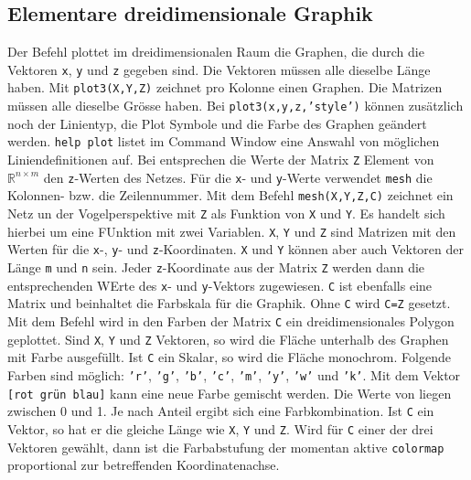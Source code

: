 \subsection{Elementare dreidimensionale Graphik}
Der Befehl  plottet im dreidimensionalen Raum die Graphen, die durch die Vektoren \texttt{x}, \texttt{y} und \texttt{z} gegeben sind. Die Vektoren müssen alle dieselbe Länge haben. Mit {\color{red}\texttt{plot3(X,Y,Z)}} zeichnet pro Kolonne einen Graphen. Die Matrizen müssen alle dieselbe Grösse haben. Bei {\color{red}\texttt{plot3(x,y,z,'style')}} können zusätzlich noch der Linientyp, die Plot Symbole und die Farbe des Graphen geändert werden. {\color{red}\texttt{help plot}} listet im Command Window eine Answahl von möglichen Liniendefinitionen auf.
\newline\newline
Bei  entsprechen die Werte der Matrix \texttt{Z} Element von \texttt{$\mathbb{R}^{n\times m}$} den \texttt{z}-Werten des Netzes. Für die \texttt{x}- und \texttt{y}-Werte verwendet \texttt{mesh} die Kolonnen- bzw. die Zeilennummer.
\newline\newline
Mit dem Befehl {\color{red}\texttt{mesh(X,Y,Z,C)}} zeichnet ein Netz un der Vogelperspektive mit \texttt{Z} als Funktion von \texttt{X} und \texttt{Y}. Es handelt sich hierbei um eine FUnktion mit zwei Variablen. \texttt{X}, \texttt{Y} und \texttt{Z} sind Matrizen mit den Werten für die \texttt{x}-, \texttt{y}- und \texttt{z}-Koordinaten. \texttt{X} und \texttt{Y} können aber auch Vektoren der Länge \texttt{m} und \texttt{n} sein. Jeder \texttt{z}-Koordinate aus der Matrix \texttt{Z} werden dann die entsprechenden WErte des \texttt{x}- und \texttt{y}-Vektors zugewiesen. \texttt{C} ist ebenfalls eine Matrix und beinhaltet die Farbskala für die Graphik. Ohne \texttt{C} wird \texttt{C=Z} gesetzt.
\newline\newline
Mit dem Befehl  wird in den Farben der Matrix \texttt{C} ein dreidimensionales Polygon geplottet. Sind \texttt{X}, \texttt{Y} und \texttt{Z} Vektoren, so wird die Fläche unterhalb des Graphen mit Farbe ausgefüllt. Ist \texttt{C} ein Skalar, so wird die Fläche monochrom. Folgende Farben sind möglich: {\color{red}\texttt{'r'}}, {\color{red}\texttt{'g'}}, {\color{red}\texttt{'b'}}, {\color{red}\texttt{'c'}}, {\color{red}\texttt{'m'}}, {\color{red}\texttt{'y'}}, {\color{red}\texttt{'w'}} und {\color{red}\texttt{'k'}}. Mit dem Vektor {\color{red}\texttt{[rot grün blau]}} kann eine neue Farbe gemischt werden. Die Werte von liegen zwischen 0 und 1. Je nach Anteil ergibt sich eine Farbkombination. Ist \texttt{C} ein Vektor, so hat er die gleiche Länge wie \texttt{X}, \texttt{Y} und \texttt{Z}. Wird für \texttt{C} einer der drei Vektoren gewählt, dann ist die Farbabstufung der momentan aktive \texttt{colormap} proportional zur betreffenden Koordinatenachse. 
